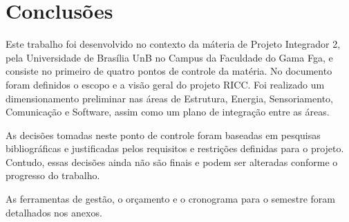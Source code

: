 \chapter[Conclusões]{Conclusões}
Este trabalho foi desenvolvido no contexto da máteria de Projeto Integrador 2, pela Universidade de Brasília UnB no Campus da Faculdade do Gama Fga, e consiste no primeiro de quatro pontos de controle da matéria. No documento foram definidos o escopo e a visão geral do projeto RICC. Foi realizado um dimensionamento preliminar nas áreas de Estrutura, Energia, Sensoriamento, Comunicação e Software, assim como um plano de integração entre as áreas.

As decisões tomadas neste ponto de controle foram baseadas em pesquisas bibliográficas e justificadas pelos requisitos e restrições definidas para o projeto. Contudo, essas decisões ainda não são finais e podem ser alteradas conforme o progresso do trabalho.

As ferramentas de gestão, o orçamento e o cronograma para o semestre foram detalhados nos anexos.